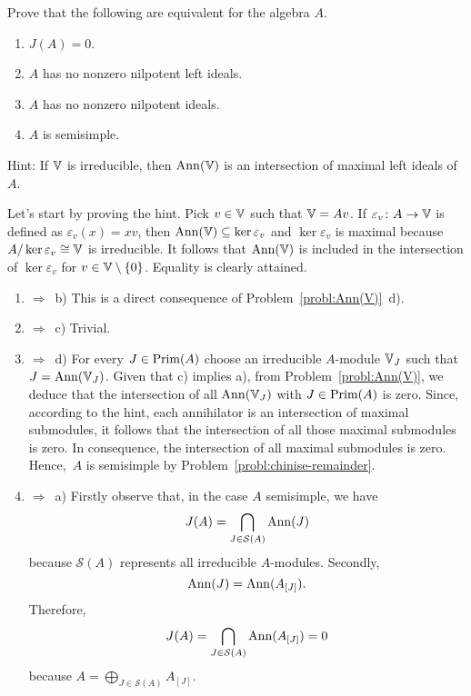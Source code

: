 \begin{probl}\label{probl:semisimplicity-and-jacobson-radical}
    Prove that the following are equivalent for the algebra\/ $A$.
    \begin{enumerate}[\rm a)]
        \item $J(A) = 0$.
        \item $A$ has no nonzero nilpotent left ideals.
        \item $A$ has no nonzero nilpotent ideals.
        \item $A$ is semisimple.
    \end{enumerate}
    
    \textrm{\rm Hint: If\/ $\mathbb V$ is irreducible, then\/ $\operatorname{\operatorname{Ann}}(\mathbb V)$ is an intersection of maximal left ideals of\/~$A$.}
\end{probl}

\begin{solution}
    Let's start by proving the hint. Pick $v\in\mathbb V$ such that $\mathbb V=Av$. If $\varepsilon_v\colon A\to\mathbb V$ is defined as $\varepsilon_v(x)=xv$, then $\operatorname{\operatorname{Ann}}(\mathbb V)\subseteq\ker\varepsilon_v$ and $\ker\varepsilon_v$ is maximal because $A/\ker\varepsilon_v\cong\mathbb V$ is irreducible. It follows that $\operatorname{\operatorname{Ann}}(\mathbb V)$ is included in the intersection of $\ker\varepsilon_v$ for $v\in\mathbb V\setminus\{0\}$. Equality is clearly attained.
    
    \begin{enumerate}[\rm a)]
        \item $\Rightarrow$~b) This is a direct consequence of Problem~\ref{probl:Ann(V)}~d).

        \item $\Rightarrow$~c) Trivial.

        \item $\Rightarrow$~d) For every $J\in\operatorname{Prim}(A)$ choose an irreducible $A$-module $\mathbb V_J$ such that $J=\operatorname{\operatorname{Ann}}(\mathbb V_J)$. Given that c) implies a), from Problem~\ref{probl:Ann(V)}, we deduce that the intersection of all $\operatorname{\operatorname{Ann}}(\mathbb V_J)$ with $J\in\operatorname{Prim}(A)$ is zero. Since, according to the hint, each annihilator is an intersection of maximal submodules, it follows that the intersection of all those maximal submodules is zero. In consequence, the intersection of all maximal submodules is zero. Hence,~$A$ is semisimple by Problem~\ref{probl:chinise-remainder}.

        \item $\Rightarrow$~a) Firstly observe that, in the case $A$ semisimple, we have
        $$
            J(A) = \bigcap_{J\in\mathcal S(A)}\operatorname{\operatorname{Ann}}(J)
        $$
        because $\mathcal S(A)$ represents all irreducible $A$-modules. Secondly,
        $$
            \operatorname{\operatorname{Ann}}(J)=\operatorname{\operatorname{Ann}}(A_{[J]}).
        $$
        Therefore,
        $$
            J(A) = \bigcap_{J\in\mathcal S(A)}\operatorname{\operatorname{Ann}}(A_{[J]})=0
        $$
        because $A=\bigoplus_{J\in\mathcal S(A)}A_{[J]}$.
    \end{enumerate}
\end{solution}

